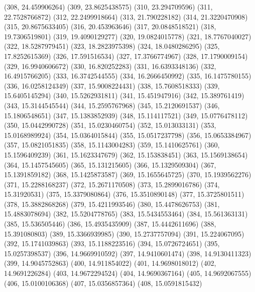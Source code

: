 {					(308, 24.459906264)
					(309, 23.8625438575)
					(310, 23.294709596)
					(311, 22.7528766872)
					(312, 22.2499918664)
					(313, 21.790228182)
					(314, 21.3220470908)
					(315, 20.8675633405)
					(316, 20.453963646)
					(317, 20.0848518521)
					(318, 19.7306519801)
					(319, 19.4090129277)
					(320, 19.0824015778)
					(321, 18.7767040027)
					(322, 18.5287979451)
					(323, 18.2823975398)
					(324, 18.0480286295)
					(325, 17.8252615369)
					(326, 17.591516534)
					(327, 17.3766774967)
					(328, 17.1790009154)
					(329, 16.9940606672)
					(330, 16.820252283)
					(331, 16.6393348136)
					(332, 16.4915766205)
					(333, 16.3742544555)
					(334, 16.2666450992)
					(335, 16.1475780155)
					(336, 16.0258124349)
					(337, 15.9008224431)
					(338, 15.7608518333)
					(339, 15.6405145294)
					(340, 15.5262931811)
					(341, 15.451947916)
					(342, 15.389761419)
					(343, 15.3144545544)
					(344, 15.2595767968)
					(345, 15.2120691537)
					(346, 15.1806548651)
					(347, 15.1383852939)
					(348, 15.114117521)
					(349, 15.0776478112)
					(350, 15.0442990728)
					(351, 15.0230460754)
					(352, 15.013033131)
					(353, 15.0168989924)
					(354, 15.0364015844)
					(355, 15.0517237798)
					(356, 15.0653384967)
					(357, 15.0821051835)
					(358, 15.1143004283)
					(359, 15.1410625761)
					(360, 15.1596409239)
					(361, 15.1623347679)
					(362, 15.153838451)
					(363, 15.1569138654)
					(364, 15.1457545605)
					(365, 15.131215605)
					(366, 15.1329509304)
					(367, 15.1391859182)
					(368, 15.1425873587)
					(369, 15.1655645725)
					(370, 15.1939562276)
					(371, 15.2288168237)
					(372, 15.2671170508)
					(373, 15.2899016786)
					(374, 15.31920531)
					(375, 15.3379080864)
					(376, 15.3510890148)
					(377, 15.3725801511)
					(378, 15.3882868268)
					(379, 15.4211993546)
					(380, 15.4478626753)
					(381, 15.4883078694)
					(382, 15.5204778765)
					(383, 15.5434553464)
					(384, 15.561363131)
					(385, 15.536505446)
					(386, 15.4935435909)
					(387, 15.4442611696)
					(388, 15.391080803)
					(389, 15.3366939985)
					(390, 15.2737757094)
					(391, 15.224067095)
					(392, 15.1741039863)
					(393, 15.1188223516)
					(394, 15.0726724651)
					(395, 15.0257398537)
					(396, 14.9669910592)
					(397, 14.9410601474)
					(398, 14.9130411323)
					(399, 14.9045752863)
					(400, 14.911854022)
					(401, 14.9698018012)
					(402, 14.9691226284)
					(403, 14.9672294524)
					(404, 14.9690367164)
					(405, 14.9692067555)
					(406, 15.0100106368)
					(407, 15.0356857364)
					(408, 15.0591815432)
}
